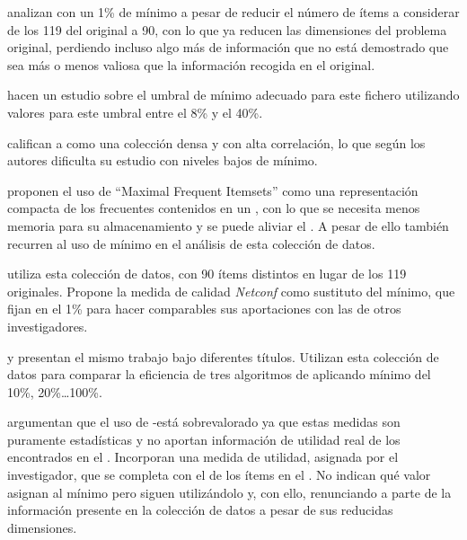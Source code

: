 \citet{WangXinCoenen-MiningEfficientlySignificantCAR-2008} analizan \mushroom con un 1\% de \soporte mínimo a pesar de reducir el número de ítems a considerar de los 119 del \dataset original a 90, con lo que ya reducen las dimensiones del problema original, perdiendo incluso algo más de información que no está demostrado que sea más o menos valiosa que la información recogida en el \dataset original.

\citet{JinMcCallenBreitbartFuhryWang-EstimatingTheNumberOfFIInLargeDB-2009} hacen un estudio sobre el umbral de \soporte mínimo adecuado para este fichero utilizando valores para este umbral entre el 8\% y el 40\%.

\citet{LiChen-MiningNonDerivableFIOverDataStream-2009} califican a \mushroom como una colección densa y con alta correlación, lo que según los autores dificulta su estudio con niveles bajos de \soporte mínimo.

\citet{LiZhang-MiningMaximalFIOnGraphicsProcessors-2010} proponen el uso de "`Maximal Frequent Itemsets"' como una representación compacta de los \itemsets frecuentes contenidos en un \dataset, con lo que se necesita menos memoria para su almacenamiento y se puede aliviar el \dilemaIR. A pesar de ello también recurren al uso de \soporte mínimo en el análisis de esta colección de datos.

\citet{HLeon-DesarrolloDeClasificadoresBasadosEnCAR-2011} utiliza esta colección de datos, con 90 ítems distintos en lugar de los 119 originales. Propone la medida de calidad \emph{Netconf} como sustituto del \soporte mínimo, que fijan en el 1\% para hacer comparables sus aportaciones con las de otros investigadores.

\citet{MalikRaheja-ImprovingPerformanceOfFrequentItemsetAlgorithm-2013} y \citet{RituArora-IntensificationOfExecutionOfFrequentItemSetAlgorithms-2014} presentan el mismo trabajo bajo diferentes títulos. Utilizan esta colección de datos para comparar la eficiencia de tres algoritmos de \ARM aplicando \soporte mínimo del 10\%, 20\%\ldots 100\%.

\citet{SahooKumarGoswami-AnAlgorithmForMiningHighUtilityClosedItemsetsAndGenerators-2014} argumentan que el uso de \soporte-\confianza está sobrevalorado ya que estas medidas son puramente estadísticas y no aportan información de utilidad real de los \itemsets encontrados en el \dataset. Incorporan una medida de utilidad, asignada por el investigador, que se completa con el \soporte de los ítems en el \dataset. No indican qué valor asignan al \soporte mínimo pero siguen utilizándolo y, con ello, renunciando a parte de la información presente en la colección de datos a pesar de sus reducidas dimensiones.

